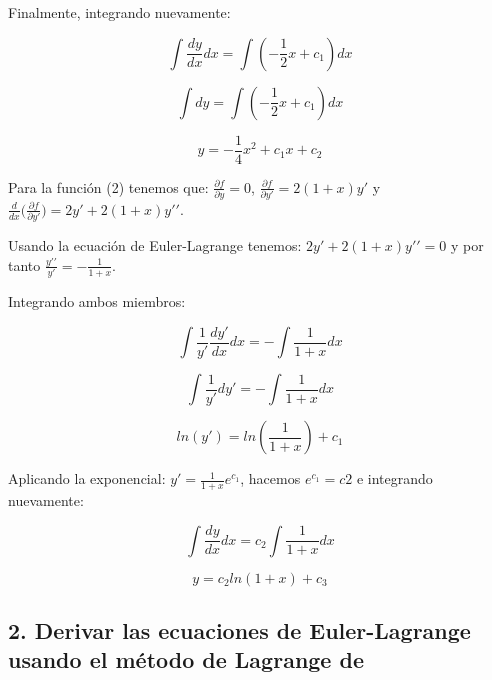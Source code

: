 \documentclass[conference]{IEEEtran}
\begin{document}
Finalmente, integrando nuevamente:

\begin{equation*}
    \int \frac{dy}{dx} dx = \int (- \frac{1}{2} x + c_1) dx
\end{equation*}

\begin{equation*}
    \int dy = \int (- \frac{1}{2} x + c_1) dx
\end{equation*}

\begin{equation*}
    y = - \frac{1}{4} x^2 + c_1x + c_2
\end{equation*}


Para la función (2) tenemos que: $\frac{\partial f}{\partial y} = 0$,
$\frac{\partial f}{\partial y\prime} = 2(1 + x)y\prime$ y
$\frac{d}{dx} \Big(\frac{\partial f}{\partial y\prime}\Big) = 2y\prime + 2(1+x)y\prime\prime$.

Usando la ecuación de Euler-Lagrange tenemos: $2y\prime + 2(1+x)y\prime\prime = 0$ y por tanto
$\frac{y\prime\prime}{y\prime} = - \frac{1}{1+x}$.


Integrando ambos miembros:

\begin{equation*}
    \int \frac{1}{y\prime} \frac{dy\prime}{dx} dx = - \int \frac{1}{1+x} dx
\end{equation*}

\begin{equation*}
    \int \frac{1}{y\prime} dy\prime = - \int \frac{1}{1+x} dx
\end{equation*}

\begin{equation*}
    ln(y\prime) = ln(\frac{1}{1+x}) + c_1
\end{equation*}

Aplicando la exponencial: $y\prime = \frac{1}{1+x} e^{c_1}$, hacemos $e^{c_1} = c2$ e integrando
nuevamente:

\begin{equation*}
    \int \frac{dy}{dx} dx = c_2 \int \frac{1}{1+x} dx
\end{equation*}

\begin{equation*}
    y = c_2 ln(1+x) + c_3
\end{equation*}




\subsection*{2. Derivar las ecuaciones de Euler-Lagrange usando el método de Lagrange de}
\end{document}
